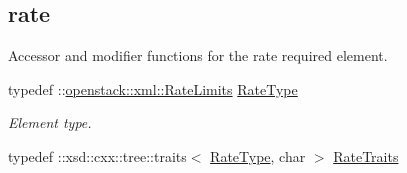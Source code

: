 \subsection*{rate}
\label{_amgrp67942503875c1ae74e4b5b80a0dade01}
Accessor and modifier functions for the rate required element. \begin{DoxyCompactItemize}
\item 
\hypertarget{classopenstack_1_1xml_1_1Limits_a17dc165d485c82cdf2277d9022c5be00}{
typedef ::\hyperlink{classopenstack_1_1xml_1_1RateLimits}{openstack::xml::RateLimits} \hyperlink{classopenstack_1_1xml_1_1Limits_a17dc165d485c82cdf2277d9022c5be00}{RateType}}
\label{classopenstack_1_1xml_1_1Limits_a17dc165d485c82cdf2277d9022c5be00}

\begin{DoxyCompactList}\small\item\em Element type. \item\end{DoxyCompactList}\item 
\hypertarget{classopenstack_1_1xml_1_1Limits_ac9afd4793d4efcb7a19c4d13087d3709}{
typedef ::xsd::cxx::tree::traits$<$ \hyperlink{classopenstack_1_1xml_1_1RateLimits}{RateType}, char $>$ \hyperlink{classopenstack_1_1xml_1_1Limits_ac9afd4793d4efcb7a19c4d13087d3709}{RateTraits}}
\label{classopenstack_1_1xml_1_1Limits_ac9afd4793d4efcb7a19c4d13087d3709}


\end{DoxyCompactItemize}
